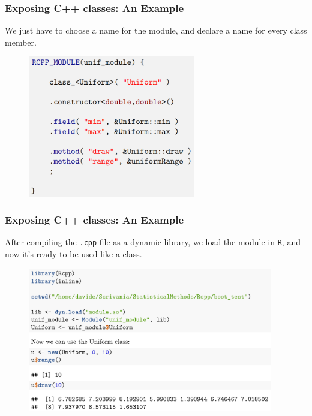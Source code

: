 \documentclass{beamer}
\def\code#1{\texttt{#1}} %
\begin{document}
\begin{frame}
\frametitle{Exposing C++ classes: An Example}
We just have to choose a name for the module, and declare a name for every class member.
\begin{figure}[s2]
    \includegraphics[width=0.65\textwidth]{exposing_classes_2.png}
\end{figure}
\end{frame}

\begin{frame}
\frametitle{Exposing C++ classes: An Example}
After compiling the \code{.cpp} file as a dynamic library, we load the module in \code{R}, and now it's ready to be used like a class.
\begin{figure}[s2]
    \includegraphics[width=0.95\textwidth]{exposing_classes_3.png}
\end{figure}
\end{frame}
\end{document}
